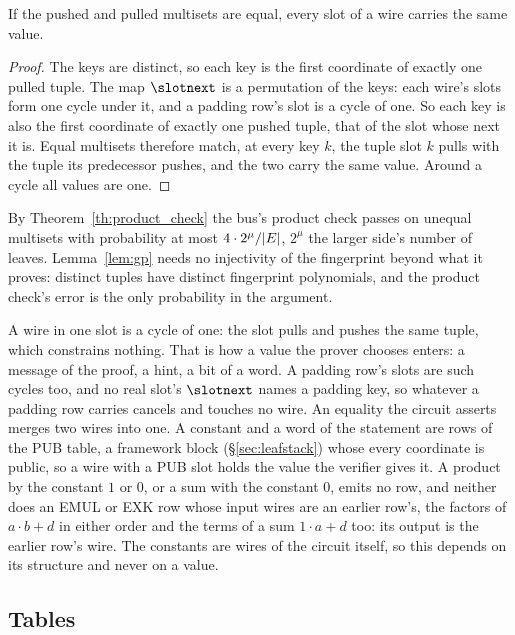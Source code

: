 \begin{lemma}\label{lem:rec-cycles}
If the pushed and pulled multisets are equal, every slot of a wire carries the same value.
\end{lemma}
\begin{proof}
The keys are distinct, so each key is the first coordinate of exactly one pulled tuple. The map $\slotnext$ is a permutation of the keys: each wire's slots form one cycle under it, and a padding row's slot is a cycle of one. So each key is also the first coordinate of exactly one pushed tuple, that of the slot whose next it is. Equal multisets therefore match, at every key $k$, the tuple slot $k$ pulls with the tuple its predecessor pushes, and the two carry the same value. Around a cycle all values are one.
\end{proof}

By Theorem~\ref{th:product_check} the bus's product check passes on unequal multisets with probability at most $4\cdot2^{\mu}/|E|$, $2^{\mu}$ the larger side's number of leaves. Lemma~\ref{lem:gp} needs no injectivity of the fingerprint beyond what it proves: distinct tuples have distinct fingerprint polynomials, and the product check's error is the only probability in the argument.

A wire in one slot is a cycle of one: the slot pulls and pushes the same tuple, which constrains nothing. That is how a value the prover chooses enters: a message of the proof, a hint, a bit of a word. A padding row's slots are such cycles too, and no real slot's $\slotnext$ names a padding key, so whatever a padding row carries cancels and touches no wire. An equality the circuit asserts merges two wires into one. A constant and a word of the statement are rows of the \textsf{PUB} table, a framework block (\S\ref{sec:leafstack}) whose every coordinate is public, so a wire with a \textsf{PUB} slot holds the value the verifier gives it. A product by the constant $1$ or $0$, or a sum with the constant $0$, emits no row, and neither does an \textsf{EMUL} or \textsf{EXK} row whose input wires are an earlier row's, the factors of $a\cdot b+d$ in either order and the terms of a sum $1\cdot a+d$ too: its output is the earlier row's wire. The constants are wires of the circuit itself, so this depends on its structure and never on a value.

\subsection{Tables}\label{rec:tables}

